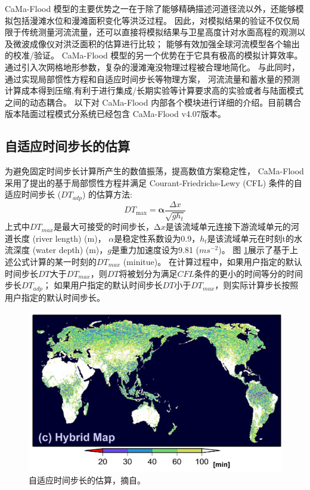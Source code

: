 CaMa-Flood 模型的主要优势之一在于除了能够精确描述河道径流以外，还能够模拟包括漫滩水位和漫滩面积变化等洪泛过程。
因此，对模拟结果的验证不仅仅局限于传统测量河流流量，还可以直接将模拟结果与卫星高度计对水面高程的观测以及微波成像仪对洪泛面积的估算进行比较；
能够有效加强全球河流模型各个输出的校准/验证\citep{yamazaki2012adjustment,yamazaki2012analysis}。
CaMa-Flood 模型的另一个优势在于它具有极高的模拟计算效率。通过引入次网格地形参数，复杂的漫滩淹没物理过程被合理地简化。
与此同时，通过实现局部惯性方程和自适应时间步长等物理方案\citep{bates2010}，
河流流量和蓄水量的预测计算成本得到压缩,有利于进行集成/长期实验等计算要求高的实验或者与陆面模式之间的动态耦合。
以下对 CaMa-Flood 内部各个模块进行详细的介绍。目前耦合版本陆面过程模式分系统已经包含 CaMa-Flood v4.07版本。


\subsection{自适应时间步长的估算}
为避免固定时间步长计算所产生的数值振荡，提高数值方案稳定性，
CaMa-Flood 采用了\citet{bates2010}提出的基于局部惯性方程并满足 Courant-Friedrichs-Lewy (CFL) 
条件的自适应时间步长 ($DT_{adp}$) 的估算方法:
\begin{equation}
{DT}_{\max }=\boldsymbol{\alpha} \frac{\Delta x}{\sqrt{g h_{t}}}
\end{equation}
上式中$DT_{max}$是最大可接受的时间步长，$∆x$是该流域单元连接下游流域单元的河道长度 (river length) (m)，
$\alpha$是稳定性系数设为0.9，$h_t$是该流域单元在时刻t的水流深度 (water depth) (m)，$g$是重力加速度设为9.81 ($m s^{-2}$)。
图 \ref{fig:自适应时间步长的估算}展示了基于上述公式计算的某一时刻的$DT_{max}$ (minitue)。
在计算过程中，如果用户指定的默认时间步长$DT$大于$DT_{max}$，则$DT$将被划分为满足$CFL$条件的更小的时间等分的时间步长$DT_{adp}$；
如果用户指定的默认时间步长$DT$小于$DT_{max}$，则实际计算步长按照用户指定的默认时间步长。
{
\begin{figure}[]
\centering
\includegraphics{Figures/陆地表面的水分循环/自适应时间步长的估算.png}
\caption{自适应时间步长的估算，摘自\citet{yamazaki2013improving}。}
\label{fig:自适应时间步长的估算}
\end{figure}
}


